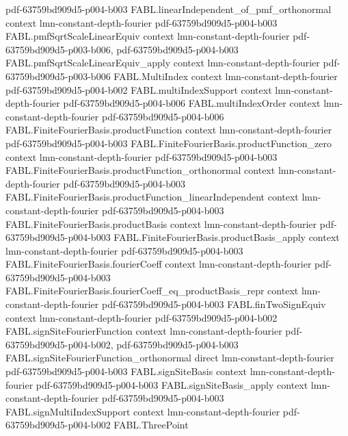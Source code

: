 \begin{theorem}
  {pdf-63759bd909d5-p004-b003}
\proofstep
  {FABL.linearIndependent_of_pmf_orthonormal}
  {context}
  {lmn-constant-depth-fourier}
  {pdf-63759bd909d5-p004-b003}
\proofstep
  {FABL.pmfSqrtScaleLinearEquiv}
  {context}
  {lmn-constant-depth-fourier}
  {pdf-63759bd909d5-p003-b006,
    pdf-63759bd909d5-p004-b003}
\proofstep
  {FABL.pmfSqrtScaleLinearEquiv_apply}
  {context}
  {lmn-constant-depth-fourier}
  {pdf-63759bd909d5-p003-b006}
\proofstep
  {FABL.MultiIndex}
  {context}
  {lmn-constant-depth-fourier}
  {pdf-63759bd909d5-p004-b002}
\proofstep
  {FABL.multiIndexSupport}
  {context}
  {lmn-constant-depth-fourier}
  {pdf-63759bd909d5-p004-b006}
\proofstep
  {FABL.multiIndexOrder}
  {context}
  {lmn-constant-depth-fourier}
  {pdf-63759bd909d5-p004-b006}
\proofstep
  {FABL.FiniteFourierBasis.productFunction}
  {context}
  {lmn-constant-depth-fourier}
  {pdf-63759bd909d5-p004-b003}
\proofstep
  {FABL.FiniteFourierBasis.productFunction_zero}
  {context}
  {lmn-constant-depth-fourier}
  {pdf-63759bd909d5-p004-b003}
\proofstep
  {FABL.FiniteFourierBasis.productFunction_orthonormal}
  {context}
  {lmn-constant-depth-fourier}
  {pdf-63759bd909d5-p004-b003}
\proofstep
  {FABL.FiniteFourierBasis.productFunction_linearIndependent}
  {context}
  {lmn-constant-depth-fourier}
  {pdf-63759bd909d5-p004-b003}
\proofstep
  {FABL.FiniteFourierBasis.productBasis}
  {context}
  {lmn-constant-depth-fourier}
  {pdf-63759bd909d5-p004-b003}
\proofstep
  {FABL.FiniteFourierBasis.productBasis_apply}
  {context}
  {lmn-constant-depth-fourier}
  {pdf-63759bd909d5-p004-b003}
\proofstep
  {FABL.FiniteFourierBasis.fourierCoeff}
  {context}
  {lmn-constant-depth-fourier}
  {pdf-63759bd909d5-p004-b003}
\proofstep
  {FABL.FiniteFourierBasis.fourierCoeff_eq_productBasis_repr}
  {context}
  {lmn-constant-depth-fourier}
  {pdf-63759bd909d5-p004-b003}
\proofstep
  {FABL.finTwoSignEquiv}
  {context}
  {lmn-constant-depth-fourier}
  {pdf-63759bd909d5-p004-b002}
\proofstep
  {FABL.signSiteFourierFunction}
  {context}
  {lmn-constant-depth-fourier}
  {pdf-63759bd909d5-p004-b002,
    pdf-63759bd909d5-p004-b003}
\proofstep
  {FABL.signSiteFourierFunction_orthonormal}
  {direct}
  {lmn-constant-depth-fourier}
  {pdf-63759bd909d5-p004-b003}
\proofstep
  {FABL.signSiteBasis}
  {context}
  {lmn-constant-depth-fourier}
  {pdf-63759bd909d5-p004-b003}
\proofstep
  {FABL.signSiteBasis_apply}
  {context}
  {lmn-constant-depth-fourier}
  {pdf-63759bd909d5-p004-b003}
\proofstep
  {FABL.signMultiIndexSupport}
  {context}
  {lmn-constant-depth-fourier}
  {pdf-63759bd909d5-p004-b002}
\proofstep
  {FABL.ThreePoint}

\end{theorem}
